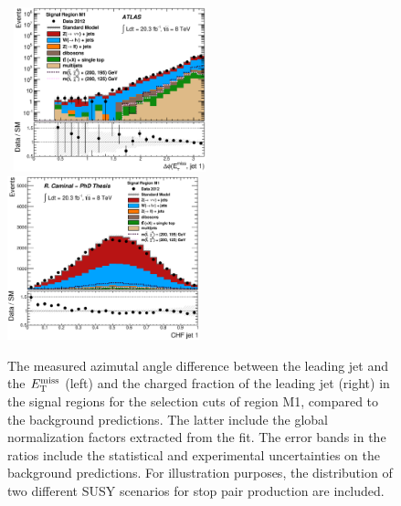 \begin{figure}[!ht]
  \begin{center}
    \mbox{
      \includegraphics[width=0.495\textwidth]{MonojetAnalysis/Figures/plot_Stop_A6_SR_dPhi_met_j1_fitted.eps}
      \includegraphics[width=0.495\textwidth]{MonojetAnalysis/Figures/plot_Stop_A6_SR_j1_chf_fitted.eps}
    }
  \end{center}
  \caption[Kinematic distributions of the $\Delta\phi(\met,\text{jet 1})$ and the charged fraction of the leading jet in the signal regions for the selection cuts of region M1, after the normalization factors extracted from the fit have been applied.]
{The measured azimutal angle difference between the leading jet and the $E_{\mathrm{T}}^{\mathrm{miss}}$ (left) and the charged fraction of the leading jet (right) in the signal regions for the selection cuts of region M1, compared to the background predictions. The latter include the global normalization factors extracted from the fit. The error bands in the ratios include the statistical and experimental uncertainties on the background predictions. For illustration purposes, the distribution of two different SUSY scenarios for stop pair production are included.}
  \label{fig:Plot_M1_SR_Jet1}
\end{figure}

